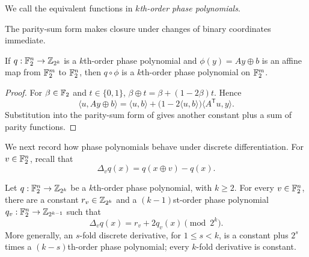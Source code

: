 We call the equivalent functions in
 \emph{$k$th-order phase
polynomials}.

The parity-sum form makes closure under changes of binary coordinates
immediate.

\begin{corollary}
    \label{cor:phase-polynomial-affine-pullback}
    If $q:\mathbb{F}_2^n\to\mathbb{Z}_{2^k}$ is a $k$th-order phase polynomial and
    $\phi(y)=Ay\oplus b$ is an affine map from \(\mathbb{F}_2^m\) to \(\mathbb{F}_2^n\),
    then $q\circ\phi$ is a $k$th-order phase polynomial on \(\mathbb{F}_2^m\).
\end{corollary}

\begin{proof}
    For $\beta\in\mathbb{F}_2$ and $t\in\{0,1\}$,
    \(\beta\oplus t=\beta+(1-2\beta)t\).  Hence
    \[
        \langle u,Ay\oplus b\rangle
        =\langle u,b\rangle
        +\bigl(1-2\langle u,b\rangle\bigr)
        \langle A^{\mathsf T}u,y\rangle.
    \]
    Substitution into the parity-sum form of
     gives another constant plus a
    sum of parity functions.
\end{proof}

We next record how phase polynomials behave under discrete differentiation.
For $v\in\mathbb{F}_2^n$, recall that
\[
    \Delta_vq(x)=q(x\oplus v)-q(x).
\]

\begin{theorem}
    \label{thm:phase-polynomial-derivative}
    Let $q:\mathbb{F}_2^n\to\mathbb{Z}_{2^k}$ be a $k$th-order phase polynomial, with
    $k\geq2$.  For every $v\in\mathbb{F}_2^n$, there are a constant
    $r_v\in\mathbb{Z}_{2^k}$ and a $(k-1)$st-order phase polynomial
    $q_v:\mathbb{F}_2^n\to\mathbb{Z}_{2^{k-1}}$ such that
    \begin{equation}
        \label{eq:general-phase-derivative}
        \Delta_vq(x)=r_v+2q_v(x)\pmod {2^k}.
    \end{equation}
    More generally, an $s$-fold discrete derivative, for $1\leq s<k$,
    is a constant plus $2^s$ times a $(k-s)$th-order phase polynomial;
    every $k$-fold derivative is constant.
\end{theorem}


